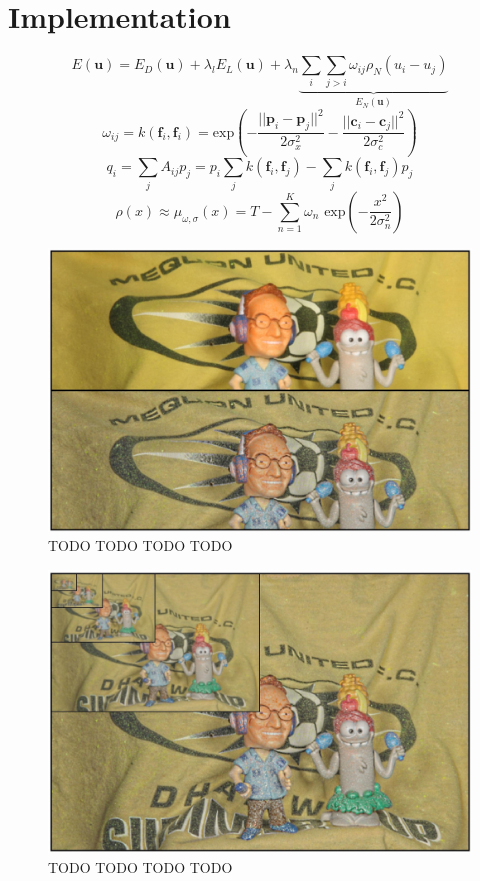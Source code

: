 \documentclass[10pt,twocolumn,letterpaper]{article}
\begin{document}
\section{Implementation}
\begin{equation}
E(\textbf{u}) = E_D(\textbf{u}) + \lambda_l E_L(\textbf{u})
+ \lambda_n \underbrace{\sum_i \sum_{j>i} \omega_{ij} \rho_N(u_i-u_j)}_{E_N(\textbf{u})}
\end{equation}
\begin{equation}
\omega_{ij} = k(\textbf{f}_i,\textbf{f}_i) = 
\text{exp}\left(-\frac{||\textbf{p}_i-\textbf{p}_j||^2}{2 \sigma^2_x}
- \frac{||\textbf{c}_i-\textbf{c}_j||^2}{2 \sigma^2_c}\right)
\end{equation}
\begin{equation}
q_i = \sum_j A_{ij} p_j = p_i \sum_j k(\textbf{f}_i,\textbf{f}_j)
- \sum_j k(\textbf{f}_i,\textbf{f}_j) p_j
\end{equation}
\begin{equation}
\rho(x) \approx \mu_{\omega,\sigma}(x) = T - \sum^K_{n=1} \omega_n \text{ exp}\left(-\frac{x^2}{2\sigma^2_n}\right)
\end{equation}
\begin{figure}[t]
\begin{center}
   \includegraphics[width=.8\linewidth]{figs/structureDecomp.jpg}
\end{center}
   \caption{TODO TODO TODO TODO}
\label{fig:structure}
\end{figure}

\begin{figure}[t]
\begin{center}
   \includegraphics[width=.8\linewidth]{figs/pyramids.jpg}
\end{center}
   \caption{TODO TODO TODO TODO}
\label{fig:structure}
\end{figure}
\end{document}
